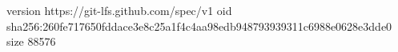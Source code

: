 version https://git-lfs.github.com/spec/v1
oid sha256:260fe717650fddace3e8c25a1f4c4aa98edb948793939311c6988e0628e3dde0
size 88576
